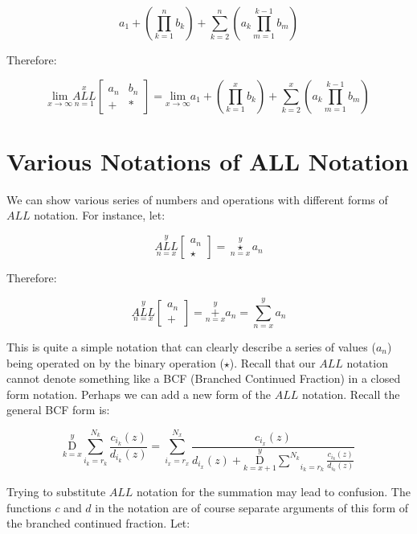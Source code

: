 \documentclass{article}
\begin{document}
$$a_1 + (\underset{k=1}{\overset{n}{\prod}} b_{k})+\underset{k=2}{\overset{n}{\sum}} (a_{k} \underset{m=1}{\overset{k-1}{\prod}} b_{m})$$

Therefore:

$$\underset{x\xrightarrow{}\infty}{\text{lim}}\underset{n=1}{\overset{x}{ALL}} \begin{bmatrix}
a_n & b_n \\
+ & *
\end{bmatrix}=\underset{x\xrightarrow{}\infty}{\text{lim}} a_1 + (\underset{k=1}{\overset{x}{\prod}} b_{k})+\underset{k=2}{\overset{x}{\sum}} (a_{k} \underset{m=1}{\overset{k-1}{\prod}} b_{m})$$

\section{Various Notations of ALL Notation}

We can show various series of numbers and operations with different forms of $ALL$ notation. For instance, let:

$$\underset{n=x}{\overset{y}{ALL}}
\begin{bmatrix}
a_n \\
\star
\end{bmatrix} = \underset{n=x}{\overset{y}{\star}}a_n$$

Therefore:

$$\underset{n=x}{\overset{y}{ALL}}
\begin{bmatrix}
a_n \\
+
\end{bmatrix} = \underset{n=x}{\overset{y}{+}} a_n = \underset{n=x}{\overset{y}{\sum}} a_n$$

This is quite a simple notation that can clearly describe a series of values ($a_n$) being operated on by the binary operation ($\star$). Recall that our $ALL$ notation cannot denote something like a BCF (Branched Continued Fraction) in a closed form notation. Perhaps we can add a new form of the $ALL$ notation. Recall the general BCF form is:

$$\underset{k=x}{\overset{y}{ \mathrm D}} \underset{i_k=r_k}{\overset{N_k}{ \sum}} \frac{c_{i_k} (z)}{d_{i_k} (z)} = \underset{i_x=r_x}{\overset{N_x}{ \sum}} \frac{c_{i_x}(z)}{d_{i_x}(z)+ \underset{k=x+1}{\overset{y}{ \mathrm D}} \underset{i_k=r_k}{\overset{N_k}{ \sum}} \frac{c_{i_k} (z)}{d_{i_k} (z)}}$$

Trying to substitute $ALL$ notation for the summation may lead to confusion. The functions $c$ and $d$ in the notation are of course separate arguments of this form of the branched continued fraction. Let:
\end{document}
